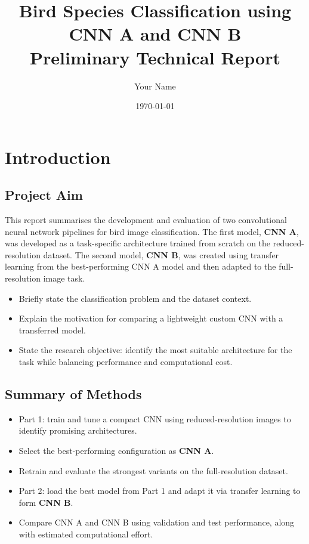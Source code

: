 \documentclass[11pt, a4paper]{report}
\title{\textbf{Bird Species Classification using CNN A and CNN B}\\[0.5em] \Large Preliminary Technical Report}
\author{Your Name}
\date{\today}
\begin{document}
\maketitle
\tableofcontents
\listoffigures
\listoftables

\chapter{Introduction}
\section{Project Aim}
This report summarises the development and evaluation of two convolutional neural network pipelines for bird image classification. The first model, \textbf{CNN A}, was developed as a task-specific architecture trained from scratch on the reduced-resolution dataset. The second model, \textbf{CNN B}, was created using transfer learning from the best-performing CNN A model and then adapted to the full-resolution image task.

\begin{itemize}[leftmargin=1.5em]
    \item Briefly state the classification problem and the dataset context.
    \item Explain the motivation for comparing a lightweight custom CNN with a transferred model.
    \item State the research objective: identify the most suitable architecture for the task while balancing performance and computational cost.
\end{itemize}

\section{Summary of Methods}
\begin{itemize}[leftmargin=1.5em]
    \item Part 1: train and tune a compact CNN using reduced-resolution images to identify promising architectures.
    \item Select the best-performing configuration as \textbf{CNN A}.
    \item Retrain and evaluate the strongest variants on the full-resolution dataset.
    \item Part 2: load the best model from Part 1 and adapt it via transfer learning to form \textbf{CNN B}.
    \item Compare CNN A and CNN B using validation and test performance, along with estimated computational effort.
\end{itemize}
\end{document}
